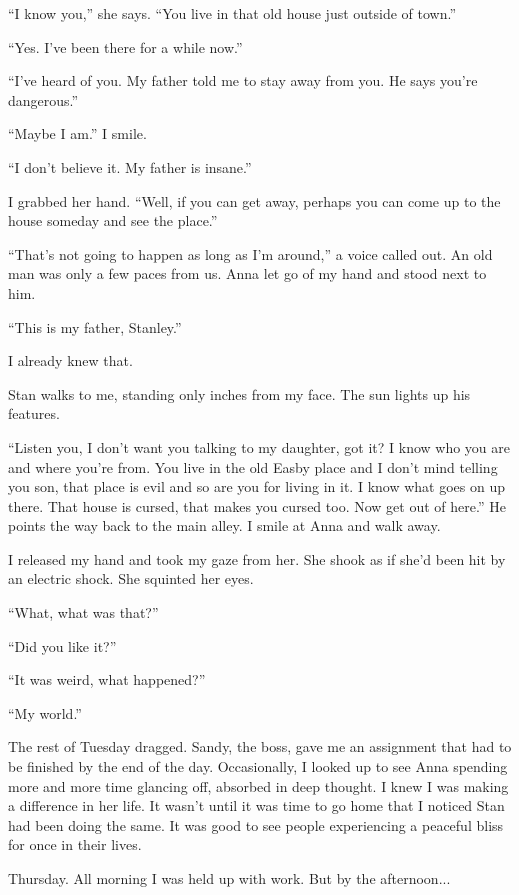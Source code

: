 \documentclass[
]{article}
\begin{document}
``I know you,'' she says. ``You live in that old house just outside of
town.''

``Yes. I've been there for a while now.''

``I've heard of you. My father told me to stay away from you. He says
you're dangerous.''

``Maybe I am.'' I smile.

``I don't believe it. My father is insane.''

I grabbed her hand. ``Well, if you can get away, perhaps you can come up
to the house someday and see the place.''

``That's not going to happen as long as I'm around,'' a voice called
out. An old man was only a few paces from us. Anna let go of my hand and
stood next to him.

``This is my father, Stanley.''

I already knew that.

Stan walks to me, standing only inches from my face. The sun lights up
his features.

``Listen you, I don't want you talking to my daughter, got it? I know
who you are and where you're from. You live in the old Easby place and I
don't mind telling you son, that place is evil and so are you for living
in it. I know what goes on up there. That house is cursed, that makes
you cursed too. Now get out of here.'' He points the way back to the
main alley. I smile at Anna and walk away.

I released my hand and took my gaze from her. She shook as if she'd been
hit by an electric shock. She squinted her eyes.

``What, what was that?''

``Did you like it?''

``It was weird, what happened?''

``My world.''

The rest of Tuesday dragged. Sandy, the boss, gave me an assignment that
had to be finished by the end of the day. Occasionally, I looked up to
see Anna spending more and more time glancing off, absorbed in deep
thought. I knew I was making a difference in her life. It wasn't until
it was time to go home that I noticed Stan had been doing the same. It
was good to see people experiencing a peaceful bliss for once in their
lives.

Thursday. All morning I was held up with work. But by the afternoon...
\end{document}
